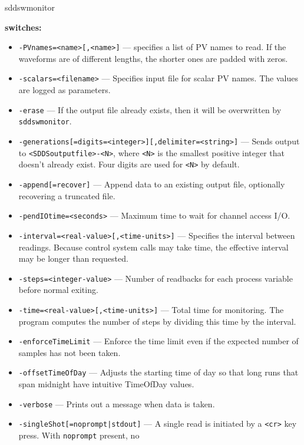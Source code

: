 \begin{sddsprog}{sddswmonitor}
\item \textbf{switches:}
  \begin{itemize}
    \item {\verb+-PVnames=<name>[,<name>]+} ---
          specifies a list of PV names to read. If the waveforms are of different
          lengths, the shorter ones are padded with zeros.
    \item {\tt -scalars=<filename>} --- Specifies input file for scalar PV names.
          The values are logged as parameters.
    \item {\tt -erase} --- If the output file already exists, then it will be
          overwritten by \verb+sddswmonitor+.
    \item {\verb+-generations[=digits=<integer>][,delimiter=<string>]+} ---
          Sends output to \verb+<SDDSoutputfile>-<N>+, where \verb+<N>+ is the
          smallest positive integer that doesn't already exist. Four digits are
          used for \verb+<N>+ by default.
    \item {\tt -append[=recover]} --- Append data to an existing output file,
          optionally recovering a truncated file.
    \item {\tt -pendIOtime=<seconds>} --- Maximum time to wait for channel
          access I/O.
    \item {\tt -interval=<real-value>[,<time-units>]} --- Specifies the
          interval between readings. Because control system calls may take time,
          the effective interval may be longer than requested.
    \item {\tt -steps=<integer-value>} --- Number of readbacks for each process
          variable before normal exiting.
    \item {\tt -time=<real-value>[,<time-units>]} --- Total time for
          monitoring. The program computes the number of steps by dividing this
          time by the interval.
    \item {\tt -enforceTimeLimit} --- Enforce the time limit even if the
          expected number of samples has not been taken.
    \item {\tt -offsetTimeOfDay} --- Adjusts the starting time of day so that
          long runs that span midnight have intuitive TimeOfDay values.
    \item {\tt -verbose} --- Prints out a message when data is taken.
    \item {\verb+-singleShot[=noprompt|stdout]+} --- A single read is
          initiated by a \verb+<cr>+ key press. With \verb+noprompt+ present, no

\end{itemize}
\end{sddsprog}
